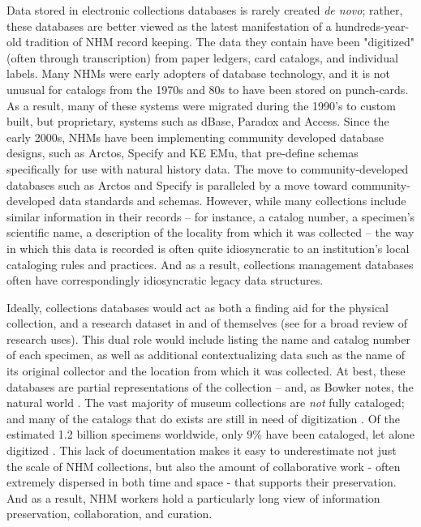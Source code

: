 Data stored in electronic collections databases is rarely created \textit{de novo}; rather, these databases are better viewed as the latest manifestation of a hundreds-year-old tradition of NHM record keeping. The data they contain have been "digitized" (often through transcription) from paper ledgers, card catalogs, and individual labels. Many NHMs were early adopters of database technology, and it is not unusual for catalogs from the 1970s and 80s to have been stored on punch-cards. As a result, many of these systems were migrated during the 1990's to custom built, but proprietary, systems such as dBase, Paradox and Access. Since the early 2000s, NHMs have been implementing community developed database designs, such as Arctos, Specify and KE EMu, that pre-define schemas specifically for use with natural history data. The move to community-developed databases such as Arctos and Specify is paralleled by a move toward community-developed data standards and schemas.  However, while many collections include similar information in their records – for instance, a catalog number, a specimen’s scientific name, a description of the locality from which it was collected – the way in which this data is recorded is often quite idiosyncratic to an institution’s local cataloging rules and practices. And as a result, collections management databases often have correspondingly idiosyncratic legacy data structures.

Ideally, collections databases would act as both a finding aid for the physical collection, and a research dataset in and of themselves (see \cite{Chapman2005} for a broad review of research uses). This dual role would include listing the name and catalog number of each specimen, as well as additional contextualizing data such as the name of its original collector and the location from which it was collected. At best, these databases are partial representations of the collection -- and, as Bowker notes, the natural world \cite{Bowker_2000}. The vast majority of museum collections are \textit{not} fully cataloged; and many of the catalogs that do exists are still in need of digitization \cite{Beaman_2012}. Of the estimated 1.2 billion specimens worldwide, only 9\% have been cataloged, let alone digitized \cite{Ari_o_2010}. This lack of documentation makes it easy to underestimate not just the scale of NHM collections, but also the amount of collaborative work  - often extremely dispersed in both time and space - that supports their preservation. And as a result, NHM workers hold a particularly long view of information preservation, collaboration, and curation.